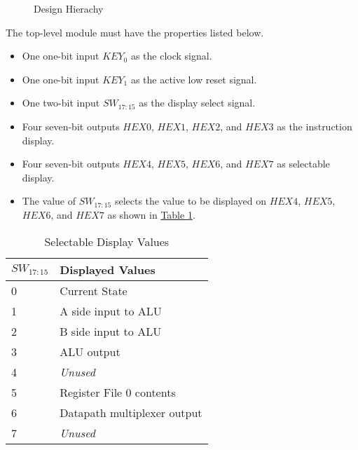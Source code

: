 \begin{figure}[htbp]
\begin{center}
    \end{center}
    \caption{Design Hierachy \label{fig:hierarchy}}
\end{figure}

The top-level module must have the properties listed below.

\begin{itemize}
    \item One one-bit input $KEY_0$ as the clock signal.
    \item One one-bit input $KEY_1$ as the active low reset signal.
    \item One two-bit input $SW_{17:15}$ as the display select signal.
    \item Four seven-bit outputs $HEX0$, $HEX1$, $HEX2$, and $HEX3$ as the instruction display.
    \item Four seven-bit outputs $HEX4$, $HEX5$, $HEX6$, and $HEX7$ as selectable display.
    \item The value of $SW_{17:15}$ selects the value to be displayed on $HEX4$, $HEX5$, $HEX6$, and $HEX7$ as shown in \hyperref[tab:display]{Table \ref*{tab:display}}.
\end{itemize}

\begin{table}[htbp] 
    \centering
    \begin{tabular}{ll}                             \toprule
        $SW_{17:15}$    & Displayed Values              \\\midrule
        0               & Current State                 \\
        1               & A side input to ALU           \\
        2               & B side input to ALU           \\
        3               & ALU output                    \\
        4               & \emph{Unused}                 \\
        5               & Register File 0 contents      \\
        6               & Datapath multiplexer output   \\
        7               & \emph{Unused}                 \\\bottomrule
    \end{tabular}
\caption{Selectable Display Values\label{tab:display}}
\end{table}

